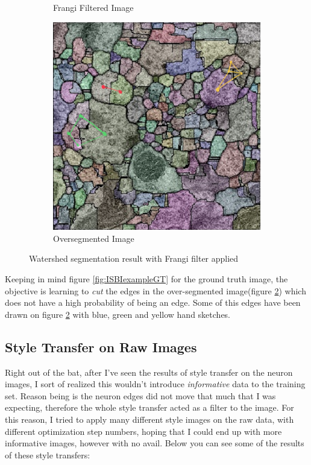 \documentclass[12pt, a4paper]{scrartcl}
\begin{document}
\begin{figure}[H]
\begin{subfigure}{.3\textwidth}
  \caption{Frangi Filtered Image}
  \label{fig:frangi2}
\end{subfigure}
\begin{subfigure}{.3\textwidth}
  \centering
  \includegraphics[width=.9\linewidth]{frangi3}
  \caption{Oversegmented Image}
  \label{fig:frangi3}
\end{subfigure}

\label{fig:frangi}
\caption{Watershed segmentation result with Frangi filter applied}
\end{figure}

Keeping in mind figure \ref{fig:ISBIexampleGT} for the ground truth image, the objective is learning to \emph{cut} the edges in the over-segmented image(figure \ref{fig:frangi3}) which does not have a high probability of being an edge. Some of this edges have been drawn on figure \ref{fig:frangi3} with blue, green and yellow hand sketches.

\subsection{Style Transfer on Raw Images}

Right out of the bat, after I've seen the results of style transfer on the neuron images, I sort of realized this wouldn't introduce \emph{informative} data to the training set. Reason being is the neuron edges did not move that much that I was expecting, therefore the whole style transfer acted as a filter to the image. For this reason, I tried to apply many different style images on the raw data, with different optimization step numbers, hoping that I could end up with more informative images, however with no avail. Below you can see some of the results of these style transfers:
\end{document}
